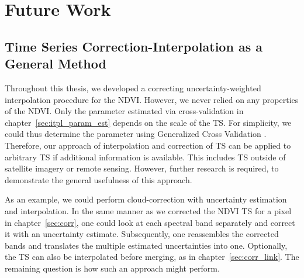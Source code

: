 \section{Future Work}{
    \label{sec:FutureWork}

    \subsection{Time Series Correction-Interpolation as a General Method}{
        Throughout this thesis, we developed a correcting uncertainty-weighted interpolation procedure for the NDVI. However, we never relied on any properties of the NDVI. Only the parameter estimated via cross-validation in chapter~\ref{sec:itpl_param_est} depends on the scale of the {TS}. For simplicity, we could thus determine the parameter using Generalized Cross Validation \citep{ripleyFitSmoothingSpline2022}. Therefore, our approach of interpolation and correction of {TS} can be applied to arbitrary {TS} if additional information is available. This includes TS outside of satellite imagery or remote sensing. However, further research is required, to demonstrate the general usefulness of this approach.

        As an example, we could perform cloud-correction with uncertainty estimation and interpolation.
        In the same manner as we corrected the NDVI {TS} for a pixel in chapter~\ref{sec:corr}, one could look at each spectral band separately and correct it with an uncertainty estimate. Subsequently, one reassembles the corrected bands and translates the multiple estimated uncertainties into one. Optionally, the {TS} can also be interpolated before merging, as in chapter~\ref{sec:corr_link}. The remaining question is how such an approach might perform.
    }



}
